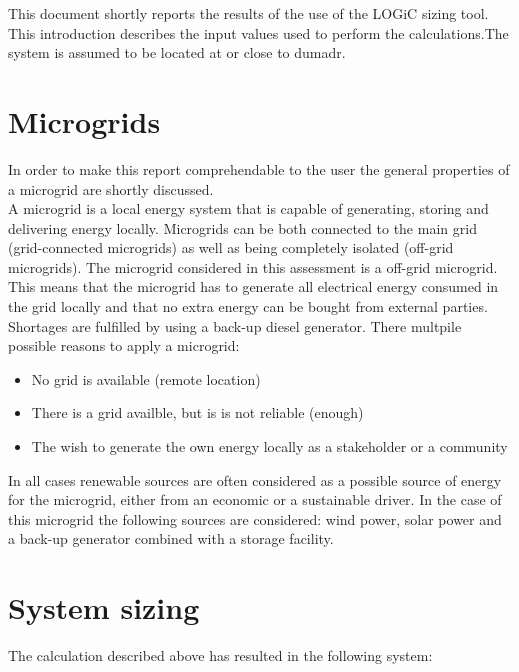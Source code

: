 \documentclass{article}
\begin{document}
\begin{multicols*}{2}

This document shortly reports the results of the use of the LOGiC sizing tool. This introduction describes the input values used to perform the calculations.The system is assumed to be located at or close to dumadr.

\section*{Microgrids}

In order to make this report comprehendable to the user the general properties of a microgrid are shortly discussed.\\ A microgrid is a local energy system that is capable of generating, storing and delivering energy locally. Microgrids can be both connected to the main grid (grid-connected microgrids) as well as being completely isolated (off-grid microgrids). The microgrid considered in this assessment is a off-grid microgrid. This means that the microgrid has to generate all electrical energy consumed in the grid locally and that no extra energy can be bought from external parties. Shortages are fulfilled by using a back-up diesel generator. There multpile possible reasons to apply a microgrid: \begin{itemize}

 \item No grid is available (remote location) 

\item There is a grid availble, but is is not reliable (enough)  

\item The wish to generate the own energy locally as a stakeholder or a community 

\end{itemize}

In all cases renewable sources are often considered as a possible source of energy for the microgrid, either from an economic or a sustainable driver. In the case of this microgrid the following sources are considered: wind power, solar power and a back-up generator combined with a storage facility.

\section*{System sizing}

The calculation described above has resulted in the following system:


\end{multicols*}
\end{document}
